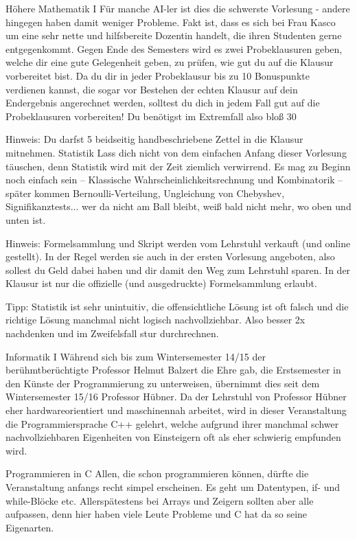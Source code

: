 Höhere Mathematik I
Für manche AI-ler ist dies die schwerste Vorlesung - andere hingegen haben damit weniger Probleme. Fakt ist, dass es sich bei Frau Kasco um eine sehr nette und hilfsbereite Dozentin handelt, die ihren Studenten gerne entgegenkommt. Gegen Ende des Semesters wird es zwei Probeklausuren geben, welche dir eine gute Gelegenheit geben, zu prüfen, wie gut du auf die Klausur vorbereitet bist. Da du dir in jeder Probeklausur bis zu 10 Bonuspunkte verdienen kannst, die sogar vor Bestehen der echten Klausur auf dein Endergebnis angerechnet werden, solltest du dich in jedem Fall gut auf die Probeklausuren vorbereiten! Du benötigst im Extremfall also bloß 30%

Hinweis: Du darfst 5 beidseitig handbeschriebene Zettel in die Klausur mitnehmen.
Statistik
Lass dich nicht von dem einfachen Anfang dieser Vorlesung täuschen, denn Statistik wird mit der Zeit ziemlich verwirrend. Es mag zu Beginn noch einfach sein – Klassische Wahrscheinlichkeitsrechnung und Kombinatorik – später kommen Bernoulli-Verteilung, Ungleichung von Chebyshev, Signifikanztests... wer da nicht am Ball bleibt, weiß bald nicht mehr, wo oben und unten ist.

Hinweis: Formelsammlung und Skript werden vom Lehrstuhl verkauft (und online gestellt). In der Regel werden sie auch in der ersten Vorlesung angeboten, also sollest du Geld dabei haben und dir damit den Weg zum Lehrstuhl sparen. In der Klausur ist nur die offizielle (und ausgedruckte) Formelsammlung erlaubt.

Tipp: Statistik ist sehr unintuitiv, die offensichtliche Lösung ist oft falsch und die richtige Lösung manchmal nicht logisch nachvollziehbar. Also besser 2x nachdenken und im Zweifelsfall stur durchrechnen.

Informatik I
Während sich bis zum Wintersemester 14/15 der berühmtberüchtigte Professor Helmut Balzert die Ehre gab, die Erstsemester in den Künste der Programmierung zu unterweisen, übernimmt dies seit dem Wintersemester 15/16 Professor Hübner. Da der Lehrstuhl von Professor Hübner eher hardwareorientiert und maschinennah arbeitet, wird in dieser Veranstaltung die Programmiersprache C++ gelehrt, welche aufgrund ihrer manchmal schwer nachvollziehbaren Eigenheiten von Einsteigern oft als eher schwierig empfunden wird. 

Programmieren in C
Allen, die schon programmieren können, dürfte die Veranstaltung anfangs recht simpel erscheinen. Es geht um Datentypen, if- und while-Blöcke etc. Allerspätestens bei Arrays und Zeigern sollten aber alle aufpassen, denn hier haben viele Leute Probleme und C hat da so seine Eigenarten.

